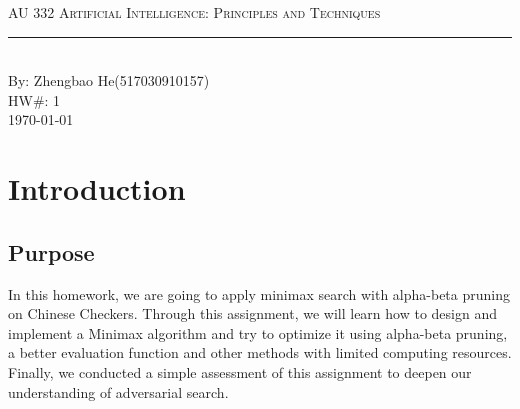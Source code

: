 \documentclass[aps,letterpaper,10pt]{revtex4}
\newcommand{\labtitle}{AU 332 Artificial Intelligence: Principles and Techniques}
\newcommand{\authorname}{Zhengbao He(517030910157)}
\newcommand{\hw}{1}
\begin{document}


\begin{titlepage}
\begin{center}
{\Large \textsc{\labtitle} \\ \vspace{4pt}}
\rule[13pt]{\textwidth}{1pt} \\ \vspace{150pt}
{\large By: \authorname \\ \vspace{10pt}
HW\#: \hw \\ \vspace{10pt}
\today}
\end{center}
\end{titlepage}





\section{Introduction}
\subsection{Purpose}
\begin{comment}
This is a lab template which has a ton of different things which are useful in writing lab write-ups in the Computer Eningeering field.
This is demonstrating the comment block. 
Don't be overwhelmed, it may seem like a lot to take in at a time, but it's worth spending the time learning it.
\end{comment}
In this homework, we are going to apply minimax search with alpha-beta pruning on Chinese Checkers.
Through this assignment, we will learn how to design and implement a Minimax algorithm 
and try to optimize it using alpha-beta pruning, a better evaluation function and other methods with limited computing resources.
Finally, we conducted a simple assessment of this assignment to deepen our understanding of adversarial search.

\vspace{3mm} %
\end{document}
